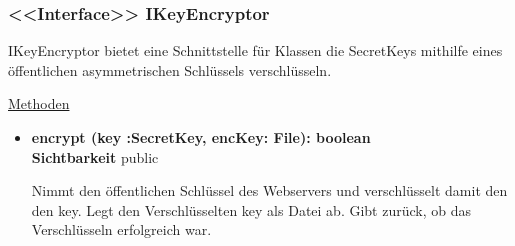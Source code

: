 \subsubsection{<<Interface>> IKeyEncryptor} \label{app:klasse:IKeyEncryptor}
IKeyEncryptor bietet eine Schnittstelle für Klassen die SecretKeys mithilfe eines öffentlichen asymmetrischen Schlüssels verschlüsseln. \newline

\underline{Methoden}
\begin{itemize}
\itemsep0pt
\item \textbf{encrypt (key :SecretKey, encKey: File): boolean}\hfill\\
\textbf{Sichtbarkeit} public

Nimmt den öffentlichen Schlüssel des Webservers und verschlüsselt damit den den key. Legt den Verschlüsselten key als Datei ab. Gibt zurück, ob das Verschlüsseln erfolgreich war.

\end{itemize}